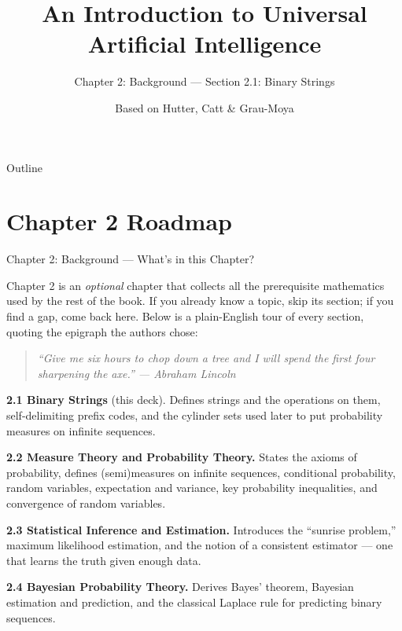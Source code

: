 \documentclass[aspectratio=169,10pt]{beamer}
\title[UAI -- Ch.2.1]{An Introduction to Universal Artificial Intelligence}
\subtitle{Chapter 2: Background --- Section 2.1: Binary Strings}
\author{Based on Hutter, Catt \& Grau-Moya}
\institute{CRC Press / Chapman \& Hall, 2024}
\date{}
\begin{document}
\begin{frame}
  \titlepage
\end{frame}

\begin{frame}{Outline}
  \tableofcontents
\end{frame}

\section{Chapter 2 Roadmap}

\begin{frame}[allowframebreaks]{Chapter 2: Background --- What's in this Chapter?}

Chapter 2 is an \emph{optional} chapter that collects all the prerequisite
mathematics used by the rest of the book. If you already know a topic, skip
its section; if you find a gap, come back here. Below is a plain-English
tour of every section, quoting the epigraph the authors chose:

\begin{quote}
\itshape ``Give me six hours to chop down a tree and I will spend the first
four sharpening the axe.'' \hfill --- Abraham Lincoln
\end{quote}

\textbf{2.1 Binary Strings} (this deck). Defines strings and the operations
on them, self-delimiting prefix codes, and the cylinder sets used later to
put probability measures on infinite sequences.

\framebreak

\textbf{2.2 Measure Theory and Probability Theory.} States the axioms of
probability, defines (semi)measures on infinite sequences, conditional
probability, random variables, expectation and variance, key probability
inequalities, and convergence of random variables.

\textbf{2.3 Statistical Inference and Estimation.} Introduces the
``sunrise problem,'' maximum likelihood estimation, and the notion of a
consistent estimator --- one that learns the truth given enough data.

\textbf{2.4 Bayesian Probability Theory.} Derives Bayes' theorem, Bayesian
estimation and prediction, and the classical Laplace rule for predicting
binary sequences.

\framebreak


\end{frame}
\end{document}

